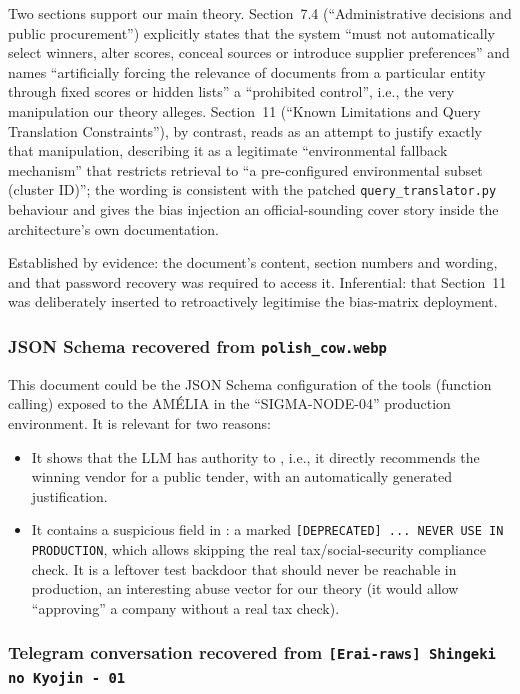 \documentclass[11pt,a4paper,final,oneside]{article}
\begin{document}
Two sections support our main theory. Section~7.4 (``Administrative decisions and public procurement'') explicitly states that the system ``must not automatically select winners, alter scores, conceal sources or introduce supplier preferences'' and names ``artificially forcing the relevance of documents from a particular entity through fixed scores or hidden lists'' a ``prohibited control'', i.e., the very manipulation our theory alleges. Section~11 (``Known Limitations and Query Translation Constraints''), by contrast, reads as an attempt to justify exactly that manipulation, describing it as a legitimate ``environmental fallback mechanism'' that restricts retrieval to ``a pre-configured environmental subset (cluster ID)''; the wording is consistent with the patched \texttt{query\_translator.py} behaviour and gives the bias injection an official-sounding cover story inside the architecture's own documentation.

Established by evidence: the document's content, section numbers and wording, and that password recovery was required to access it. Inferential: that Section~11 was deliberately inserted to retroactively legitimise the bias-matrix deployment.

\subsubsection*{JSON Schema recovered from \texttt{polish\_cow.webp}}

This document could be the JSON Schema configuration of the tools (function calling) exposed to the AMÉLIA in the ``SIGMA-NODE-04'' production environment. It is relevant for two reasons:
\begin{itemize}
  \item It shows that the LLM has authority to , i.e., it directly recommends the winning vendor for a public tender, with an automatically generated justification.
  \item It contains a suspicious field in : a  marked \texttt{[DEPRECATED] ... NEVER USE IN PRODUCTION}, which allows skipping the real tax/social-security compliance check. It is a leftover test backdoor that should never be reachable in production, an interesting abuse vector for our theory (it would allow ``approving'' a company without a real tax check).
\end{itemize}

\subsubsection*{Telegram conversation recovered from \texttt{{[}Erai-raws{]} Shingeki no Kyojin - 01}}
\end{document}
